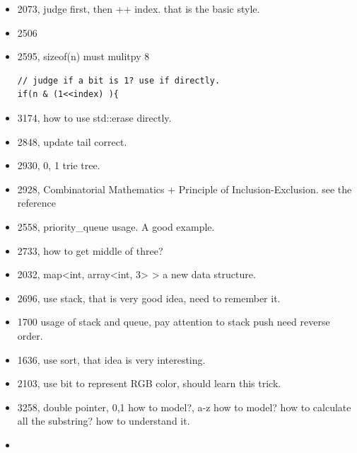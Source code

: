 \documentclass[a4paper,11pt,twoside]{book}
\begin{document}
\begin{itemize}
	
	\item 2073,  judge first, then ++ index. that is the basic style. 
	
	\item 2506 
	
	\item 2595, sizeof(n) must mulitpy 8
\begin{lstlisting}
// judge if a bit is 1? use if directly. 
if(n & (1<<index) ){
\end{lstlisting}
	
	\item 3174, how to use std::erase directly.
	
	\item 2848, update tail correct.
	
	\item 2930, 0, 1 trie tree.
	
	\item 2928, Combinatorial Mathematics + Principle of Inclusion-Exclusion. see the reference 
	
	
	\item 2558, priority\_queue usage. A good example.
	
	\item 2733, how to get middle of three? 
	
	\item 2032, map<int, array<int, 3> > a new data structure.
	
	\item 2696, use stack, that is very good idea, need to remember it. 
	
	\item 1700 usage of stack and queue, pay attention to stack push need reverse order. 
	
	\item 1636, use sort, that idea is very interesting. 
	
	\item 2103, use bit to represent RGB color, should learn this trick. 
	
	\item 3258, double pointer,  0,1 how to model?, a-z how to model?  how to calculate all the substring?  how to understand it. 
	
	\item 
	
\end{itemize}

	


\end{document}
